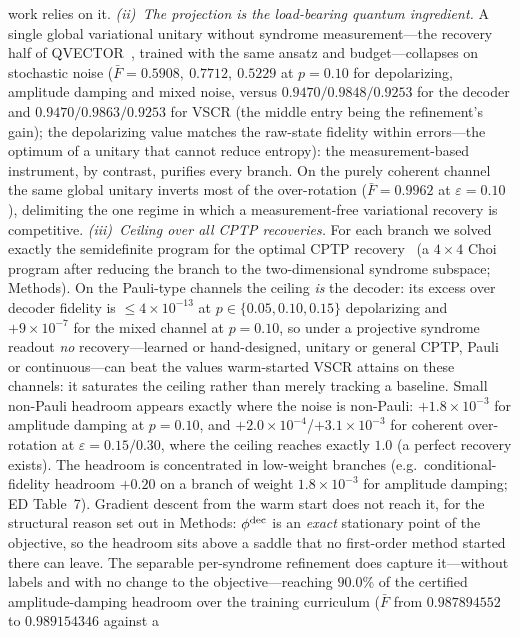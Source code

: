 \documentclass[aps,prxquantum,reprint,superscriptaddress]{revtex4-2}
\begin{document}
work relies on it.
\emph{(ii)~The projection is the load-bearing quantum ingredient.} A single
global variational unitary without syndrome measurement---the recovery half
of QVECTOR~\cite{johnson_qvector}, trained with the same ansatz and
budget---collapses on stochastic noise ($\bar F=0.5908,\ 0.7712,\ 0.5229$
at $p=0.10$ for depolarizing, amplitude damping and mixed noise, versus
$0.9470/0.9848/0.9253$ for the decoder and $0.9470/0.9863/0.9253$ for VSCR (the
middle entry being the refinement's gain); the depolarizing value matches
the raw-state fidelity within errors---the optimum of a unitary that cannot
reduce entropy): the measurement-based instrument, by contrast, purifies
every
branch. On the purely coherent channel the same global unitary inverts most
of the over-rotation ($\bar F=0.9962$ at $\varepsilon=0.10$), delimiting
the one regime in which a measurement-free variational recovery is
competitive.
\emph{(iii)~Ceiling over all CPTP recoveries.} For each branch we solved
exactly the semidefinite program for the optimal CPTP
recovery~\cite{reimpell_werner} (a $4\times4$ Choi program after reducing
the branch to the two-dimensional syndrome subspace; Methods). On the
Pauli-type channels the ceiling \emph{is} the decoder: its excess over
decoder fidelity is $\le4\times10^{-13}$ at $p\in\{0.05,0.10,0.15\}$
depolarizing and $+9\times10^{-7}$ for the mixed channel at $p=0.10$, so
under a projective syndrome readout \emph{no} recovery---learned or
hand-designed, unitary or general CPTP, Pauli or continuous---can beat the
values warm-started VSCR attains on these channels: it saturates the
ceiling rather than merely tracking a baseline. Small non-Pauli headroom
appears exactly where the noise is non-Pauli: $+1.8\times10^{-3}$ for
amplitude damping at $p=0.10$, and $+2.0\times10^{-4}$/$+3.1\times10^{-3}$
for coherent over-rotation at $\varepsilon=0.15/0.30$, where the ceiling
reaches exactly $1.0$ (a perfect recovery exists). The headroom is
concentrated in low-weight branches (e.g.\ conditional-fidelity headroom
$+0.20$ on a branch of weight $1.8\times10^{-3}$ for amplitude damping;
ED Table~7). Gradient descent from the warm start does not reach it, for the
structural reason set out in Methods: $\phi^{\rm dec}$ is an \emph{exact}
stationary point of the objective, so the headroom sits above a saddle that no
first-order method started there can leave. The separable per-syndrome
refinement does capture it---without labels and with no change to the
objective---reaching $90.0\%$ of the certified amplitude-damping headroom over
the training curriculum ($\bar F$ from $0.987894552$ to $0.989154346$ against a
\end{document}
